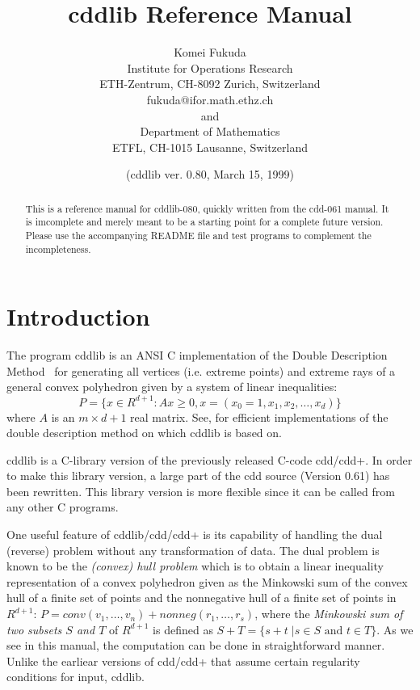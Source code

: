 \documentclass[11pt]{article}
\begin{document}
\title{cddlib Reference Manual}
\author{
Komei Fukuda \\
Institute for Operations Research\\
ETH-Zentrum, CH-8092 Zurich, Switzerland\\
fukuda@ifor.math.ethz.ch \\and\\
Department of Mathematics\\
ETFL, CH-1015 Lausanne, Switzerland}
\date{ (cddlib ver. 0.80,  March 15, 1999)}

\maketitle
\begin{abstract}
This is a reference manual for cddlib-080, quickly written from the cdd-061 manual.  It is imcomplete and merely meant to be a starting point for a complete future version.  Please use the accompanying README file and test programs to complement the incompleteness.
\end{abstract}

\section{Introduction} \label{INTRODUCTION}

The program  cddlib  is an ANSI C implementation of 
the Double Description Method~\cite{mrtt-ddm-53}
for generating all vertices (i.e. extreme points)
and extreme rays of a general 
convex polyhedron given by a system of linear inequalities:
\[
   P = \{ x  \in R^{d+1}:  A  x  \ge 0, x=(x_0=1, x_1, x_2, \ldots, x_d) \}
\]
where $A$ is an $m \times d+1$ real matrix.   See, \cite{fp-ddmr-96} for
efficient implementations of the double description
method on which cddlib is based on.

cddlib is a C-library version of the previously released C-code cdd/cdd+.
In order to make this library version, a large part of the cdd source
(Version 0.61) has been rewritten.
This library version is more flexible since it can be called from any
other C programs.

One useful feature of  cddlib/cdd/cdd+ is its capability
of handling the dual (reverse)  problem without any transformation
of data.  The dual problem is known to be the 
{\em (convex) hull problem\/} which
is to obtain a linear inequality representation
of a convex polyhedron given as the Minkowski sum of 
the convex hull of a finite set of points and the nonnegative
hull of a finite set of points in $R^{d+1}$: 
$P = conv(v_1,\ldots,v_n) +  nonneg(r_1,\ldots,r_s)$, where
 the {\em Minkowski sum of two subsets $S$ and $T$} of $R^{d+1}$ is defined
as $S + T = \{ s + t \; |  s \in S \mbox{ and } t \in T \}$.
As we see in this manual, the computation can be done
in straightforward manner.  Unlike the earliear versions of
cdd/cdd+ that assume certain regularity conditions for input, cddlib.
\end{document}
